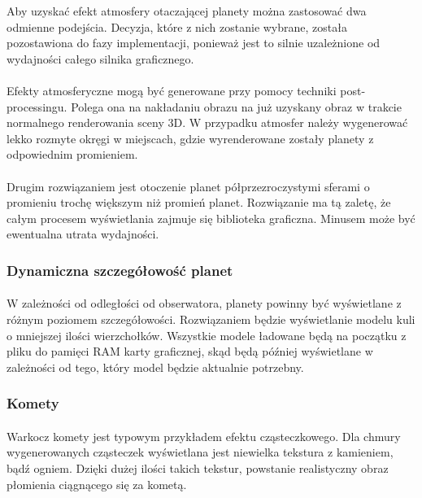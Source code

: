 Aby uzyskać efekt atmosfery otaczającej planety można zastosować dwa odmienne podejścia. Decyzja, które z nich zostanie wybrane, została pozostawiona do fazy implementacji, ponieważ jest to silnie uzależnione od wydajności całego silnika graficznego.

\paragraph{}

Efekty atmosferyczne mogą być generowane przy pomocy techniki post-processingu. Polega ona na nakładaniu obrazu na już uzyskany obraz w trakcie normalnego renderowania sceny 3D. W przypadku atmosfer należy wygenerować lekko rozmyte okręgi w miejscach, gdzie wyrenderowane zostały planety z odpowiednim promieniem.

\paragraph{}

Drugim rozwiązaniem jest otoczenie planet półprzezroczystymi sferami o promieniu trochę większym niż promień planet. Rozwiązanie ma tą zaletę, że całym procesem wyświetlania zajmuje się biblioteka graficzna. Minusem może być ewentualna utrata wydajności.


\subsubsection{Dynamiczna szczegółowość planet}\label{subsub:dynamiczna szczegolowosc planet}

\paragraph{}

W zależności od odległości od obserwatora, planety powinny być wyświetlane z różnym poziomem szczegółowości. Rozwiązaniem będzie wyświetlanie modelu kuli o mniejszej ilości wierzchołków. Wszystkie modele ładowane będą na początku z pliku do pamięci RAM karty graficznej, skąd będą później wyświetlane w zależności od tego, który model będzie aktualnie potrzebny.

\subsubsection{Komety}\label{subsub:komety}

\paragraph{}

Warkocz komety jest typowym przykładem efektu cząsteczkowego. Dla chmury wygenerowanych cząsteczek wyświetlana jest niewielka tekstura z kamieniem, bądź ogniem. Dzięki dużej ilości takich tekstur, powstanie realistyczny obraz płomienia ciągnącego się za kometą.

